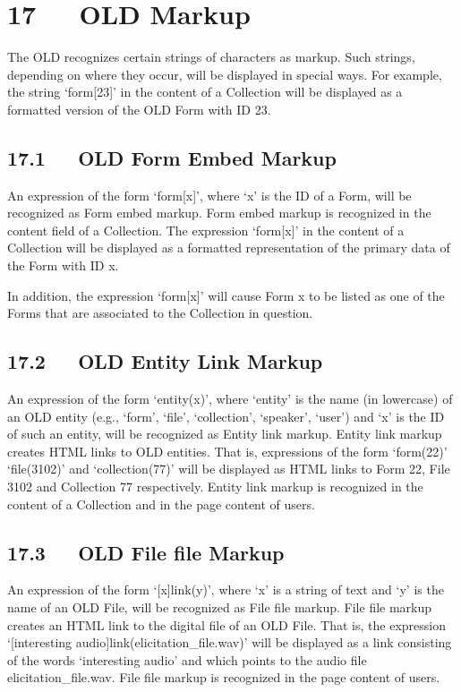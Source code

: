 \documentclass[letterpaper,10pt,english]{sphinxmanual}
\begin{document}
\chapter{17   OLD Markup}
\label{documentation:old-markup}
The OLD recognizes certain strings of characters as markup.  Such strings,
depending on where they occur, will be displayed in special ways.  For example,
the string `form{[}23{]}' in the content of a Collection will be displayed as a
formatted version of the OLD Form with ID 23.


\section{17.1   OLD Form Embed Markup}
\label{documentation:old-form-embed-markup}
An expression of the form `form{[}x{]}', where `x' is the ID of a Form, will be
recognized as Form embed markup.  Form embed markup is recognized in
the content field of a Collection.  The expression `form{[}x{]}' in the content of
a Collection will be displayed as a formatted representation of the primary data
of the Form with ID x.

In addition, the expression `form{[}x{]}' will cause Form x to be listed as one of
the Forms that are associated to the Collection in question.


\section{17.2   OLD Entity Link Markup}
\label{documentation:old-entity-link-markup}
An expression of the form `entity(x)', where `entity' is the name (in lowercase)
of an OLD entity (e.g., `form', `file', `collection', `speaker', `user') and `x'
is the ID of such an entity, will be recognized as Entity link markup.
Entity link markup creates HTML links to OLD entities.  That is,
expressions of the form `form(22)' `file(3102)' and `collection(77)' will be
displayed as HTML links to Form 22, File 3102 and Collection 77 respectively.
Entity link markup is recognized in the content of a Collection and in the
page content of users.


\section{17.3   OLD File file Markup}
\label{documentation:old-file-file-markup}
An expression of the form `{[}x{]}link(y)', where `x' is a string of text and `y'
is the name of an OLD File, will be recognized as File file markup.  File file
markup creates an HTML link to the digital file of an OLD File.  That is,
the expression `{[}interesting audio{]}link(elicitation\_file.wav)' will be
displayed as a link consisting of the words `interesting audio' and which points
to the audio file elicitation\_file.wav.  File file markup is recognized in the
page content of users.
\end{document}

